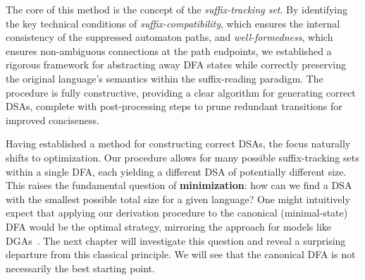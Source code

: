 The core of this method is the concept of the \textit{suffix-tracking set}. By identifying the key technical conditions of \textit{suffix-compatibility}, which ensures the internal consistency of the suppressed automaton paths, and \textit{well-formedness}, which ensures non-ambiguous connections at the path endpoints, we established a rigorous framework for abstracting away DFA states while correctly preserving the original language's semantics within the suffix-reading paradigm. The procedure is fully constructive, providing a clear algorithm for generating correct DSAs, complete with post-processing steps to prune redundant transitions for improved conciseness.

Having established a method for constructing correct DSAs, the focus naturally shifts to optimization. Our procedure allows for many possible suffix-tracking sets within a single DFA, each yielding a different DSA of potentially different size. This raises the fundamental question of \textbf{minimization}: how can we find a DSA with the smallest possible total size for a given language? One might intuitively expect that applying our derivation procedure to the canonical (minimal-state) DFA would be the optimal strategy, mirroring the approach for models like DGAs~\cite{giammarresi1999deterministic}. The next chapter will investigate this question and reveal a surprising departure from this classical principle. We will see that the canonical DFA is not necessarily the best starting point.%